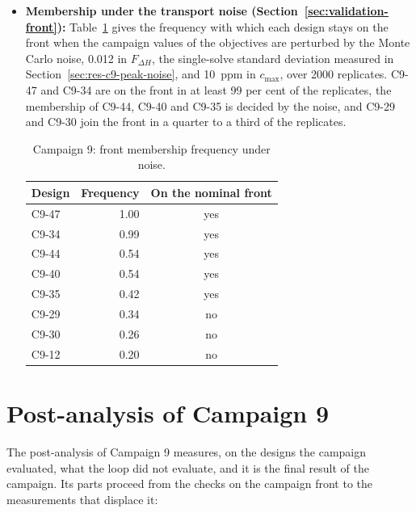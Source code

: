 \begin{itemize}
  \item \textbf{Membership under the transport noise
        (Section~\ref{sec:validation-front}):} Table~\ref{tab:c9-stability}
        gives the frequency with which each design stays on the front
        when the campaign values of the objectives are perturbed by the
        Monte Carlo noise, 0.012 in $F_{\Delta H}$, the single-solve
        standard deviation measured in Section~\ref{sec:res-c9-peak-noise},
        and \SI{10}{ppm} in $c_\mathrm{max}$, over 2000 replicates. C9-47
        and C9-34 are on the front in at least 99 per cent of the
        replicates, the membership of C9-44, C9-40 and C9-35 is decided by
        the noise, and C9-29 and C9-30 join the front in a quarter to a
        third of the replicates.

\begin{table}[htbp]
  \centering
  \small
  \caption{Campaign 9: front membership frequency under noise.}
  \label{tab:c9-stability}
  \begin{tabular}{@{}lrc@{}}
    \toprule
    Design & Frequency & On the nominal front \\
    \midrule
    C9-47 & 1.00 & yes \\
    C9-34 & 0.99 & yes \\
    C9-44 & 0.54 & yes \\
    C9-40 & 0.54 & yes \\
    C9-35 & 0.42 & yes \\
    C9-29 & 0.34 & no \\
    C9-30 & 0.26 & no \\
    C9-12 & 0.20 & no \\
    \bottomrule
  \end{tabular}
\end{table}

\end{itemize}

\section{Post-analysis of Campaign 9}
\label{sec:res-c9-post}

The post-analysis of Campaign 9 measures, on the designs the campaign
evaluated, what the loop did not evaluate, and it is the final result
of the campaign. Its parts proceed from the checks on the campaign front to the measurements that displace it:


